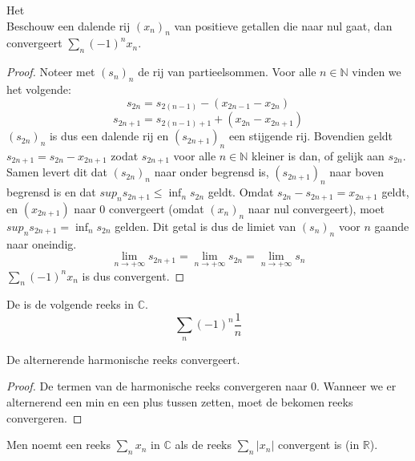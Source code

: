 \documentclass[main.tex]{subfiles}
\begin{document}
\begin{st}
  \label{st:criterium-leibniz}
  Het \\
  Beschouw een dalende rij $(x_{n})_{n}$ van positieve getallen die naar nul gaat, dan convergeert $\sum_{n}(-1)^{n}x_{n}$.

  \begin{proof}
    Noteer met $(s_{n})_{n}$ de rij van partieelsommen.
    Voor alle $n\in \mathbb{N}$ vinden we het volgende:
    \[ s_{2n} = s_{2(n-1)} - (x_{2n-1}-x_{2n}) \]
    \[ s_{2n+1} = s_{2(n-1)+1} + (x_{2n}-x_{2n+1}) \]
    $(s_{2n})_{n}$ is dus een dalende rij en $(s_{2n+1})_{n}$ een stijgende rij.
    Bovendien geldt $s_{2n+1} = s_{2n}-x_{2n+1}$ zodat $s_{2n+1}$ voor alle $n\in \mathbb{N}$ kleiner is dan, of gelijk aan $s_{2n}$.
    Samen levert dit dat $(s_{2n})_{n}$ naar onder begrensd is, $(s_{2n+1})_{n}$ naar boven begrensd is en dat $sup_{n}s_{2n+1} \le \inf_{n}s_{2n}$ geldt.
    Omdat $s_{2n}-s_{2n+1} = x_{2n+1}$ geldt, en $(x_{2n+1})$ naar $0$ convergeert (omdat $(x_{n})_{n}$ naar nul convergeert), moet $sup_{n}s_{2n+1} = \inf_{n}s_{2n}$ gelden.
    Dit getal is dus de limiet van $(s_{n})_{n}$ voor $n$ gaande naar oneindig.
    \[ \lim_{n \rightarrow +\infty}s_{2n+1} = \lim_{n \rightarrow +\infty}s_{2n} = \lim_{n \rightarrow +\infty}s_{n} \]
    $\sum_{n}(-1)^{n}x_{n}$ is dus convergent.
  \end{proof}
\end{st}

\begin{de}
  De  is de volgende reeks in $\mathbb{C}$.
  \[ \sum_{n}(-1)^{n}\frac{1}{n} \]
\end{de}

\begin{st}
  De alternerende harmonische reeks convergeert.

  \begin{proof}
    De termen van de harmonische reeks convergeren naar $0$.
    Wanneer we er alternerend een min en een plus tussen zetten, moet de bekomen reeks convergeren.
  \end{proof}
\end{st}


\begin{de}
  \label{de:absoluut-convergent}
  Men noemt een reeks $\sum_{n}x_{n}$ in $\mathbb{C}$  als de reeks $\sum_{n}|x_{n}|$ convergent is (in $\mathbb{R}$).
\end{de}
\end{document}
